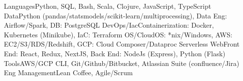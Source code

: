 \begin{additionals}
  \addional
    {Languages}{Python, SQL, Bash, Scala, Clojure, JavaScript, TypeScript}
  \addional
    {Data}{Python (pandas/statsmodels/scikit-learn/multiprocessing), Data Eng: Airflow/Spark, DB: PostgreSQL}
  \addional
    {DevOps/Iac}{Containerization: Docker, Kubernetes (Minikube), IaC: Terraform}
  \addional
    {OS/Cloud}{OS: *nix/Windows, AWS: EC2/S3/RDS/Redshift, GCP: Cloud Composer/Dataproc Serverless}
  \addional
      {Web}{Front End: React, Redux, NextJS, Back End: NodeJs (Express), Python (Flask)}
  \addional
    {Tools}{AWS/GCP CLI, Git/Github/Bitbucket, Atlassian Suite (confluence/Jira)}
  \addional
    {Eng Management}{Lean Coffee, Agile/Scrum}
\end{additionals}